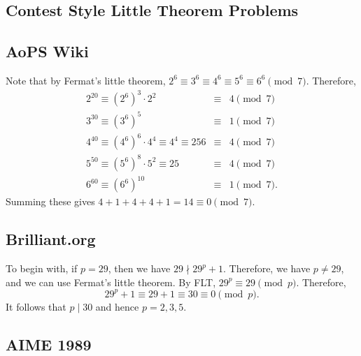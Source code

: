 \subsection{Contest Style Little Theorem Problems}
\clearpage
\subsection*{AoPS Wiki}
Note that by Fermat's little theorem, $2^6\equiv 3^6\equiv 4^6\equiv 5^6\equiv 6^6\pmod{7}$. Therefore, \begin{eqnarray*} 2^{20}\equiv \left(2^6\right)^3\cdot 2^2&\equiv& 4\pmod{7} \\ 3^{30}\equiv \left(3^6\right)^5&\equiv& 1\pmod{7} \\ 4^{40}\equiv \left(4^6\right)^{6}\cdot 4^4\equiv 4^4\equiv 256&\equiv& 4\pmod{7} \\ 5^{50}\equiv \left(5^6\right)^{8}\cdot 5^2\equiv 25&\equiv& 4\pmod{7} \\ 6^{60} \equiv \left(6^6\right)^{10}&\equiv& 1\pmod{7}. \end{eqnarray*} 
\clearpage
Summing these gives $4+1+4+4+1=14\equiv \boxed{0}\pmod{7}$. 
\subsection*{Brilliant.org} To begin with, if $p=29$, then we have $29\nmid 29^p+1$. Therefore, we have $p\neq 29$, and we can use Fermat's little theorem. By FLT, $29^p\equiv 29\pmod{p}$. Therefore, $$29^p+1\equiv 29+1\equiv 30\equiv 0\pmod{p}.$$ It follows that $p\mid 30$ and hence $p=\boxed{2,3,5}$.
\clearpage
	
\subsection{AIME 1989}

